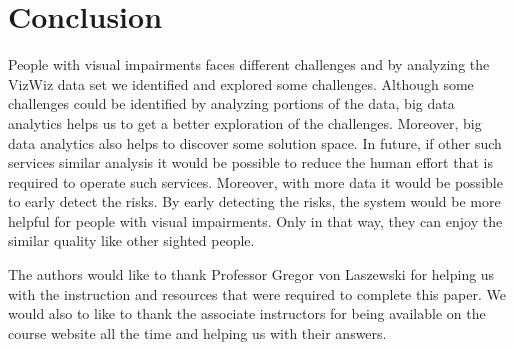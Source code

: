 \documentclass[sigconf]{acmart}
\begin{document}
\section{Conclusion}
People with visual impairments faces different challenges and by analyzing the VizWiz data set we identified and explored some challenges. Although some challenges could be identified by analyzing portions of the data, big data analytics helps us to get a better exploration of the challenges. Moreover, big data analytics also helps to discover some solution space. In future, if other such services similar analysis it would be possible to reduce the human effort that is required to operate such services. Moreover, with more data it would be possible to early detect the risks. By early detecting the risks, the system would be more helpful for people with visual impairments. Only in that way, they can enjoy the similar quality like other sighted people. 
\begin{acks}

The authors would like to thank Professor Gregor von Laszewski for helping us with the instruction and resources that were required to complete this paper. We would also to like to thank the associate instructors for being available on the course website all the time and helping us with their answers.

\end{acks}




 
\newpage
\appendix
\end{document}
